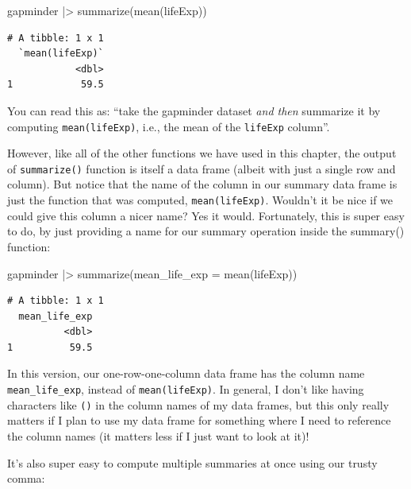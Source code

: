 \documentclass[
  letterpaper,
  DIV=11,
  numbers=noendperiod]{scrreprt}
\newenvironment{Shaded}{\begin{snugshade}}{\end{snugshade}}
\newcommand{\AttributeTok}[1]{\textcolor[rgb]{0.40,0.45,0.13}{#1}}
\newcommand{\FunctionTok}[1]{\textcolor[rgb]{0.28,0.35,0.67}{#1}}
\newcommand{\NormalTok}[1]{\textcolor[rgb]{0.00,0.23,0.31}{#1}}
\newcommand{\SpecialCharTok}[1]{\textcolor[rgb]{0.37,0.37,0.37}{#1}}
\begin{document}
\begin{Shaded}
\begin{Highlighting}[]
\NormalTok{gapminder }\SpecialCharTok{|\textgreater{}} \FunctionTok{summarize}\NormalTok{(}\FunctionTok{mean}\NormalTok{(lifeExp))}
\end{Highlighting}
\end{Shaded}

\begin{verbatim}
# A tibble: 1 x 1
  `mean(lifeExp)`
            <dbl>
1            59.5
\end{verbatim}

You can read this as: ``take the gapminder dataset \emph{and then}
summarize it by computing \texttt{mean(lifeExp)}, i.e., the mean of the
\texttt{lifeExp} column''.

However, like all of the other functions we have used in this chapter,
the output of \texttt{summarize()} function is itself a data frame
(albeit with just a single row and column). But notice that the name of
the column in our summary data frame is just the function that was
computed, \texttt{mean(lifeExp)}. Wouldn't it be nice if we could give
this column a nicer name? Yes it would. Fortunately, this is super easy
to do, by just providing a name for our summary operation inside the
summary() function:

\begin{Shaded}
\begin{Highlighting}[]
\NormalTok{gapminder }\SpecialCharTok{|\textgreater{}} \FunctionTok{summarize}\NormalTok{(}\AttributeTok{mean\_life\_exp =} \FunctionTok{mean}\NormalTok{(lifeExp))}
\end{Highlighting}
\end{Shaded}

\begin{verbatim}
# A tibble: 1 x 1
  mean_life_exp
          <dbl>
1          59.5
\end{verbatim}

In this version, our one-row-one-column data frame has the column name
\texttt{mean\_life\_exp}, instead of \texttt{mean(lifeExp)}. In general,
I don't like having characters like \texttt{()} in the column names of
my data frames, but this only really matters if I plan to use my data
frame for something where I need to reference the column names (it
matters less if I just want to look at it)!

It's also super easy to compute multiple summaries at once using our
trusty comma:
\end{document}
